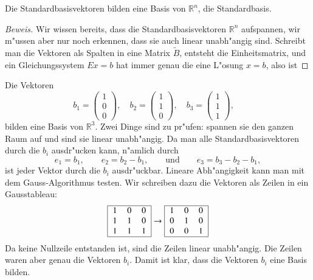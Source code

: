 \begin{satz}
Die Standardbasisvektoren bilden eine Basis von $\mathbb R^n$,
die Standardbasis.
\end{satz}

\begin{proof}[Beweis]
Wir wissen bereits, dass die Standardbasisvektoren $\mathbb R^n$ aufspannen,
wir m"ussen aber nur noch erkennen, dass sie auch linear unabh"angig sind.
Schreibt man die Vektoren als Spalten in eine Matrix $\tilde B$, entsteht die
Einheitsmatrix, und ein Gleichungssystem $Ex=b$ hat immer genau die eine
L"osung $x=b$, also ist 
\end{proof}

\begin{beispiel}
Die Vektoren 
\[
b_1=\begin{pmatrix}1\\0\\0\end{pmatrix},\quad
b_2=\begin{pmatrix}1\\1\\0\end{pmatrix},\quad
b_3=\begin{pmatrix}1\\1\\1\end{pmatrix},\quad
\]
bilden eine Basis von $\mathbb R^3$.
Zwei Dinge sind zu pr"ufen:
spannen sie den ganzen Raum auf und sind sie linear unabh"angig.
Da man alle Standardbasisvektoren durch die $b_i$ ausdr"ucken kann, n"amlich
durch
\[
e_1=b_1,\qquad e_2=b_2-b_1,\qquad\text{und}\qquad e_3=b_3-b_2-b_1,
\]
ist jeder Vektor durch die $b_i$ ausdr"uckbar. Lineare Abh"angigkeit kann
man mit dem Gauss-Algorithmus testen. Wir schreiben dazu die Vektoren
als Zeilen in ein Gausstableau:
\[
\begin{tabular}{|>{$}c<{$}>{$}c<{$}>{$}c<{$}|}
\hline
1&0&0\\
1&1&0\\
1&1&1\\
\hline
\end{tabular}
\rightarrow
\begin{tabular}{|>{$}c<{$}>{$}c<{$}>{$}c<{$}|}
\hline
1&0&0\\
0&1&0\\
0&0&1\\
\hline
\end{tabular}
\]
Da keine Nullzeile entstanden ist, sind die Zeilen linear unabh"angig. 
Die Zeilen waren aber genau die Vektoren $b_i$. Damit ist klar, dass
die Vektoren $b_i$ eine Basis bilden.
\end{beispiel}

